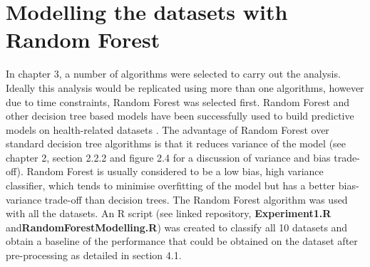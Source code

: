 \section{Modelling the datasets with Random Forest}
In chapter 3, a number of algorithms were selected to carry out the analysis. Ideally this analysis would be replicated using more than one algorithms, however due to time constraints, Random Forest was selected first. Random Forest and other decision tree based models have been successfully used to build predictive models on health-related datasets \citep{Dua:2014dz, AlWesabi:hx}. The advantage of Random Forest over standard decision tree algorithms is that it reduces variance of the model \citep{Liberman:2017wf, Ramchandani:2018vv} (see chapter 2, section 2.2.2 and figure 2.4 for a discussion of variance and bias trade-off). Random Forest is usually considered to be a low bias, high variance classifier, which tends to minimise overfitting of the model but has a better bias-variance trade-off than decision trees.\newline
The Random Forest algorithm was used with all the datasets.\newline
An R script (see linked repository, \textbf{Experiment1.R} and\textbf{RandomForestModelling.R}) was created to classify all 10 datasets and obtain a baseline of the performance that could be obtained on the dataset after pre-processing as detailed in section 4.1.\newline
